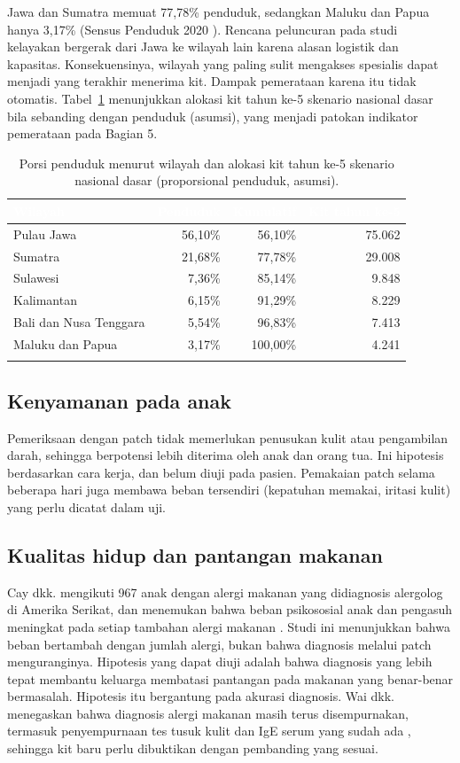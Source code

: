 \documentclass[11pt,a4paper]{article}
\newcommand{\tH}[1]{\textcolor{white}{\sffamily\bfseries\small #1}}
\newcommand{\tabstart}{\small\rowcolors{2}{white}{pale}\arrayrulecolor{rule}}
\newcommand{\hdrrow}{\rowcolor{tealdark}}
\renewcommand{\toprule}{\arrayrulecolor{tealdark}\specialrule{0.9pt}{0pt}{0pt}\arrayrulecolor{rule}}
\renewcommand{\bottomrule}{\arrayrulecolor{tealdark}\specialrule{0.9pt}{0pt}{0pt}\arrayrulecolor{rule}}
\begin{document}
Jawa dan Sumatra memuat 77,78\% penduduk, sedangkan Maluku dan Papua hanya 3,17\% (Sensus Penduduk 2020 \cite{sensus}). Rencana peluncuran pada studi kelayakan bergerak dari Jawa ke wilayah lain karena alasan logistik dan kapasitas. Konsekuensinya, wilayah yang paling sulit mengakses spesialis dapat menjadi yang terakhir menerima kit. Dampak pemerataan karena itu tidak otomatis. Tabel~\ref{tab:reg} menunjukkan alokasi kit tahun ke-5 skenario nasional dasar bila sebanding dengan penduduk (asumsi), yang menjadi patokan indikator pemerataan pada Bagian 5.

\begin{table}[htbp]
\centering
\caption{Porsi penduduk menurut wilayah dan alokasi kit tahun ke-5 skenario nasional dasar (proporsional penduduk, asumsi).}
\label{tab:reg}
\tabstart
\begin{tabular}{@{}lrrr@{}}
\toprule
\hdrrow\tH{Wilayah} & \tH{Penduduk} & \tH{Kumulatif} & \tH{Kit tahun ke-5} \\
\midrule
Pulau Jawa & 56,10\% & 56,10\% & 75.062 \\
Sumatra & 21,68\% & 77,78\% & 29.008 \\
Sulawesi & 7,36\% & 85,14\% & 9.848 \\
Kalimantan & 6,15\% & 91,29\% & 8.229 \\
Bali dan Nusa Tenggara & 5,54\% & 96,83\% & 7.413 \\
Maluku dan Papua & 3,17\% & 100,00\% & 4.241 \\
\bottomrule
\end{tabular}
\end{table}

\subsection{Kenyamanan pada anak}

Pemeriksaan dengan patch tidak memerlukan penusukan kulit atau pengambilan darah, sehingga berpotensi lebih diterima oleh anak dan orang tua. Ini hipotesis berdasarkan cara kerja, dan belum diuji pada pasien. Pemakaian patch selama beberapa hari juga membawa beban tersendiri (kepatuhan memakai, iritasi kulit) yang perlu dicatat dalam uji.

\subsection{Kualitas hidup dan pantangan makanan}

Cay dkk. mengikuti 967 anak dengan alergi makanan yang didiagnosis alergolog di Amerika Serikat, dan menemukan bahwa beban psikososial anak dan pengasuh meningkat pada setiap tambahan alergi makanan \cite{cay}. Studi ini menunjukkan bahwa beban bertambah dengan jumlah alergi, bukan bahwa diagnosis melalui patch menguranginya. Hipotesis yang dapat diuji adalah bahwa diagnosis yang lebih tepat membantu keluarga membatasi pantangan pada makanan yang benar-benar bermasalah. Hipotesis itu bergantung pada akurasi diagnosis. Wai dkk. menegaskan bahwa diagnosis alergi makanan masih terus disempurnakan, termasuk penyempurnaan tes tusuk kulit dan IgE serum yang sudah ada \cite{wai}, sehingga kit baru perlu dibuktikan dengan pembanding yang sesuai.
\end{document}
